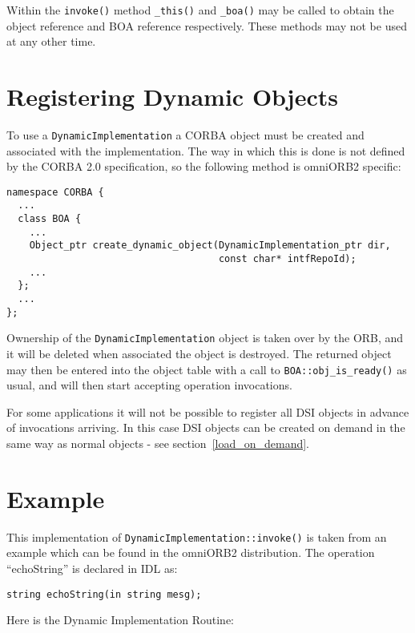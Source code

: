 \documentclass[11pt,twoside,onecolumn]{book}
\begin{document}
Within the {\tt invoke()} method {\tt \_this()} and {\tt \_boa()} may be
called to obtain the object reference and BOA reference respectively. These
methods may not be used at any other time.


\section{Registering Dynamic Objects}

To use a {\tt DynamicImplementation} a CORBA object must be created and
associated with the implementation. The way in which this is done is not
defined by the CORBA 2.0 specification, so the following method is omniORB2
specific:

{\small \begin{verbatim}
namespace CORBA {
  ...
  class BOA {
    ...
    Object_ptr create_dynamic_object(DynamicImplementation_ptr dir,
                                     const char* intfRepoId);
    ...
  };
  ...
};
\end{verbatim}}

Ownership of the {\tt DynamicImplementation} object is taken over by the ORB,
and it will be deleted when associated the object is destroyed.
The returned object may then be entered into the object table with a call to
{\tt BOA::obj\_is\_ready()} as usual, and will then start accepting operation
invocations.

For some applications it will not be possible to register all DSI objects
in advance of invocations arriving. In this case DSI objects can be
created on demand in the same way as normal objects - see
section~\ref{load_on_demand}.


\section{Example}

This implementation of {\tt DynamicImplementation::invoke()} is taken from
an example which can be found in the omniORB2 distribution. The operation
``echoString'' is declared in IDL as:

{\small \begin{verbatim}
string echoString(in string mesg);
\end{verbatim}}

\noindent{}Here is the Dynamic Implementation Routine:
\end{document}
